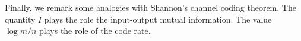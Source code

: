 Finally, we remark some analogies with Shannon's channel coding theorem. The quantity $I$ plays the role the input-output mutual information. The value $\log m / n$ plays the role of the code rate.
%
%
%
%
%
%
